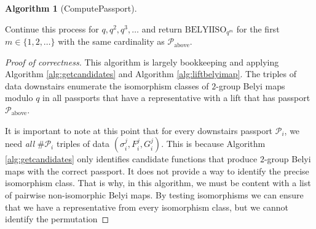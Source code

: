\documentclass{dcthesis}
\newcommand{\mm}[1]{{\color{blue} \sf MM: [#1]}}
\numberwithin{equation}{section}
\theoremstyle{definition}
\newtheorem{alg}[equation]{Algorithm}
\theoremstyle{remark}
\begin{document}
{{{\begin{alg}[ComputePassport]
\begin{enumerate}
          Continue this process for
          $q,q^2,q^3,\dots$
          and return
          $\mathrm{BELYIISO}_{q^m}$
          for the first $m\in\{1,2,\dots\}$
          with the same cardinality
          as $\mathcal{P}_\text{above}$.
      \end{enumerate}
    \end{alg}
    \begin{proof}[Proof of correctness]
      This algorithm is largely bookkeeping
      and applying Algorithm
      \ref{alg:getcandidates}
      and Algorithm
      \ref{alg:liftbelyimap}.
      The triples of data downstairs
      enumerate the isomorphism classes
      of $2$-group Belyi maps modulo $q$
      in all passports that have a representative
      with a lift that has passport
      $\mathcal{P}_\text{above}$.
      \par
      It is important to note at this point
      that for every downstairs passport
      $\mathcal{P}_i$,
      we need \emph{all} $\#\mathcal{P}_i$
      triples of data
      $(\sigma_i^j,F_i^j,G_i^j)$.
      This is because
      Algorithm \ref{alg:getcandidates}
      only identifies candidate functions
      that produce $2$-group Belyi maps
      with the correct passport.
      It does not provide a way to identify
      the precise isomorphism class.
      That is why,
      in this algorithm,
      we must be content with a list of
      pairwise
      non-isomorphic Belyi maps.
      By testing isomorphisms we can ensure
      that we have a representative
      from every isomorphism class,
      but we cannot identify the permutation

\end{proof}}}}
\end{document}
